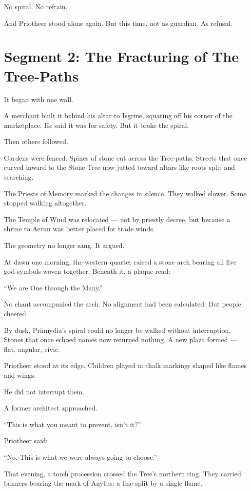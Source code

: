 \documentclass[10pt]{article}
\begin{document}
No spiral.  
No refrain.

And Priotheer stood alone again.  
But this time, not as guardian.  
As refusal.


\newpage

\section*{Segment 2: The Fracturing of The Tree-Paths}

It began with one wall.

A merchant built it behind his altar to Isgrine,  
squaring off his corner of the marketplace.  
He said it was for safety.  
But it broke the spiral.

Then others followed.

Gardens were fenced.  
Spines of stone cut across the Tree-paths.  
Streets that once curved inward to the Stone Tree  
now jutted toward altars like roots split and searching.

The Priests of Memory marked the changes in silence.  
They walked slower.  
Some stopped walking altogether.

The Temple of Wind was relocated — not by priestly decree,  
but because a shrine to Aerun was better placed for trade winds.

The geometry no longer sang.  
It argued.

At dawn one morning, the western quarter raised a stone arch  
bearing all five god-symbols woven together.  
Beneath it, a plaque read:

 “We are One through the Many.”

No chant accompanied the arch.  
No alignment had been calculated.  
But people cheered.

By dusk, Priimydia’s spiral could no longer be walked without interruption.  
Stones that once echoed names now returned nothing.  
A new plaza formed — flat, angular, civic.

Priotheer stood at its edge.  
Children played in chalk markings shaped like flames and wings.

He did not interrupt them.

A former architect approached.

 “This is what you meant to prevent, isn’t it?”

Priotheer said:

 “No. This is what we were always going to choose.”

That evening, a torch procession crossed the Tree’s northern ring.  
They carried banners bearing the mark of Anytus:  
a line split by a single flame.
\end{document}
